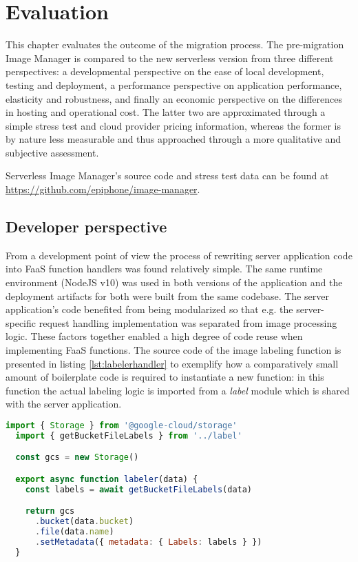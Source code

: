 \chapter{Evaluation} \label{cha:evaluation}

This chapter evaluates the outcome of the migration process. The pre-migration Image Manager is compared to the new serverless version from three different perspectives: a developmental perspective on the ease of local development, testing and deployment, a performance perspective on application performance, elasticity and robustness, and finally an economic perspective on the differences in hosting and operational cost. The latter two are approximated through a simple stress test and cloud provider pricing information, whereas the former is by nature less measurable and thus approached through a more qualitative and subjective assessment.

Serverless Image Manager's source code and stress test data can be found at \url{https://github.com/epiphone/image-manager}.

\section{Developer perspective}

From a development point of view the process of rewriting server application code into FaaS function handlers was found relatively simple. The same runtime environment (NodeJS v10) was used in both versions of the application and the deployment artifacts for both were built from the same codebase. The server application's code benefited from being modularized so that e.g. the server-specific request handling implementation was separated from image processing logic. These factors together enabled a high degree of code reuse when implementing FaaS functions. The source code of the image labeling function is presented in listing \ref{lst:labelerhandler} to exemplify how a comparatively small amount of boilerplate code is required to instantiate a new function: in this function the actual labeling logic is imported from a \textit{label} module which is shared with the server application.

\begin{lstlisting}[language=JavaScript,caption=Image labeler function handler,captionpos=b,label=lst:labelerhandler,showstringspaces=false,belowskip=2em,frame=tb,aboveskip=2em]
  import { Storage } from '@google-cloud/storage'
  import { getBucketFileLabels } from '../label'

  const gcs = new Storage()

  export async function labeler(data) {
    const labels = await getBucketFileLabels(data)

    return gcs
      .bucket(data.bucket)
      .file(data.name)
      .setMetadata({ metadata: { Labels: labels } })
  }
\end{lstlisting}

